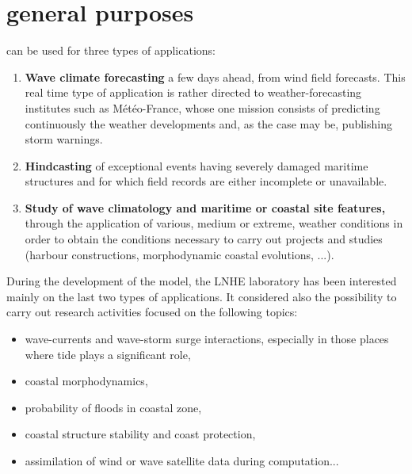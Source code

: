 \section{ \tomawac general purposes}

 \tomawac can be used for three types of applications:

 \begin{enumerate}
\item \textbf{Wave climate forecasting} a few days ahead, from wind field forecasts. This real time type of application is rather directed to weather-forecasting institutes such as Météo-France, whose one mission consists of predicting continuously the weather developments and, as the case may be, publishing storm warnings.

 \item \textbf{Hindcasting }of exceptional events having severely damaged maritime structures and for which field records are either incomplete or unavailable.

 \item \textbf{Study of wave climatology and maritime or coastal site features, }through the application of various, medium or extreme, weather conditions in order to obtain the conditions necessary to carry out projects and studies (harbour constructions, morphodynamic coastal evolutions, ...).
\end{enumerate}

During the development of the \tomawac model, the LNHE laboratory has been interested mainly on the last two types of applications. It considered also the possibility to carry out research activities focused on the following topics:

 \begin{itemize}
 \item wave-currents and wave-storm surge interactions, especially in those places where tide plays a significant role,

 \item coastal morphodynamics,

 \item probability of floods in coastal zone,

 \item coastal structure stability and coast protection,

 \item assimilation of wind or wave satellite data during computation...
\end{itemize}

